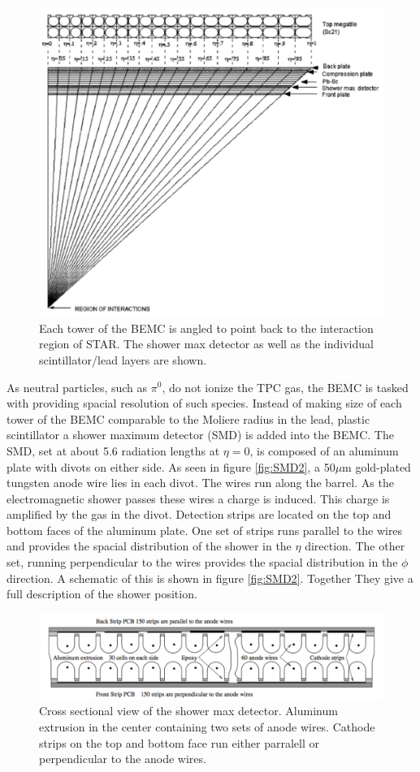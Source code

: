 \documentclass[abstract = on,listof=totoc, bibliography=totoc]{scrreprt}
\begin{document}
\begin{figure}
\begin{center}
\includegraphics[width = .7\textwidth]{BEMC2}
\caption[Barrel Electromagnetic Calorimeter 2]{Each tower of the BEMC is angled to point back to the interaction region of STAR. The shower max detector as well as the individual scintillator/lead layers are shown.}
\label{fig:BEMC2}
\end{center}
\end{figure}

As neutral particles, such as $\pi^0$, do not ionize the TPC gas, the BEMC is tasked with providing spacial resolution of such species. Instead of making size of each tower of the BEMC comparable to the Moliere radius in the lead, plastic scintillator a shower maximum detector (SMD) is added into the BEMC. The SMD, set at about 5.6 radiation lengths at $\eta=0$, is composed of an aluminum plate with divots on either side. As seen in figure \ref{fig:SMD2}, a 50$\mu$m gold-plated tungsten anode wire lies in each divot. The wires run along the barrel. As the electromagnetic shower passes these wires a charge is induced. This charge is amplified by the gas in the divot. Detection strips are located on the top and bottom faces of the aluminum plate. One set of strips runs parallel to the wires and provides the spacial distribution of the shower in the $\eta$ direction. The other set, running perpendicular to the wires provides the spacial distribution in the $\phi$ direction. A schematic of this is shown in figure \ref{fig:SMD2}. Together They give a full description of the shower position.\cite{BEMC}

\begin{figure}
\begin{center}
\includegraphics[width = .6\textwidth]{SMD2}
\caption[Shower Maximum Detector cross sectional view]{Cross sectional view of the shower max detector. Aluminum extrusion in the center containing two sets of anode wires. Cathode strips on the top and bottom face run either parralell or perpendicular to the anode wires.}
\label{fig:SMD1}
\end{center}
\end{figure}
\end{document}
